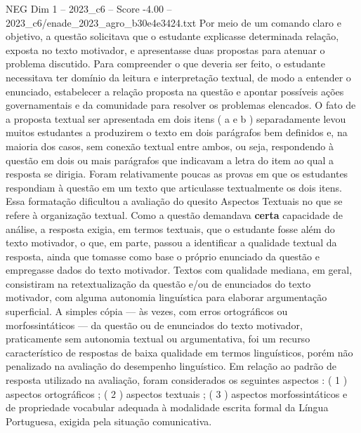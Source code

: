 \begin{textsample}{NEG Dim 1 – 2023\_c6 – Score -4.00 – 2023\_c6/enade\_2023\_agro\_b30e4e3424.txt}
Por meio de um comando claro e objetivo, a questão solicitava que o estudante explicasse determinada relação, exposta no texto motivador, e apresentasse duas propostas para atenuar o problema discutido.
Para compreender o que deveria ser feito, o estudante necessitava ter domínio da leitura e interpretação textual, de modo a entender o enunciado, estabelecer a relação proposta na questão e apontar possíveis ações governamentais e da comunidade para resolver os problemas elencados.
O fato de a proposta textual ser apresentada em dois itens ( a e b ) separadamente levou muitos estudantes a produzirem o texto em dois parágrafos bem definidos e, na maioria dos casos, sem conexão textual entre ambos, ou seja, respondendo à questão em dois ou mais parágrafos que indicavam a letra do item ao qual a resposta se dirigia.
Foram relativamente poucas as provas em que os estudantes respondiam à questão em um texto que articulasse textualmente os dois itens.
Essa formatação dificultou a avaliação do quesito Aspectos Textuais no que se refere à organização textual.
Como a questão demandava \textbf{certa} capacidade de análise, a resposta exigia, em termos textuais, que o estudante fosse além do texto motivador, o que, em parte, passou a identificar a qualidade textual da resposta, ainda que tomasse como base o próprio enunciado da questão e empregasse dados do texto motivador.
Textos com qualidade mediana, em geral, consistiram na retextualização da questão e/ou de enunciados do texto motivador, com alguma autonomia linguística para elaborar argumentação superficial.
A simples cópia — às vezes, com erros ortográficos ou morfossintáticos — da questão ou de enunciados do texto motivador, praticamente sem autonomia textual ou argumentativa, foi um recurso característico de respostas de baixa qualidade em termos linguísticos, porém não penalizado na avaliação do desempenho linguístico.
Em relação ao padrão de resposta utilizado na avaliação, foram considerados os seguintes aspectos : ( 1 ) aspectos ortográficos ; ( 2 ) aspectos textuais ; ( 3 ) aspectos morfossintáticos e de propriedade vocabular adequada à modalidade escrita formal da Língua Portuguesa, exigida pela situação comunicativa.

\end{textsample}
